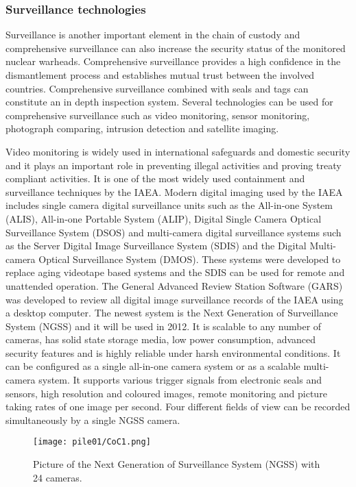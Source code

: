 \documentclass[twoside,titlepage,11pt,twocolumn,a4paper]{article}
\begin{document}
\subsubsection{Surveillance technologies}
Surveillance is another important element in the chain of custody and
comprehensive surveillance can also increase the security status of
the monitored nuclear warheads. Comprehensive surveillance provides a
high confidence in the dismantlement process and establishes mutual
trust between the involved countries. Comprehensive surveillance
combined with seals and tags can constitute an in depth inspection
system. Several technologies can be used for comprehensive
surveillance such as video monitoring, sensor monitoring, photograph
comparing, intrusion detection and satellite
imaging. \citep{wuwen2004}

Video monitoring is widely used in international safeguards and
domestic security and it plays an important role in preventing illegal
activities and proving treaty compliant activities. It is one of the
most widely used containment and surveillance techniques by the
IAEA. \citep{wuwen2004} Modern digital imaging used by the IAEA
includes single camera digital surveillance units such as the
All-in-one System (ALIS), All-in-one Portable System (ALIP), Digital
Single Camera Optical Surveillance System (DSOS) and multi-camera
digital surveillance systems such as the Server Digital Image
Surveillance System (SDIS) and the Digital Multi-camera Optical
Surveillance System (DMOS). These systems were developed to replace
aging videotape based systems and the SDIS can be used for remote and
unattended operation. The General Advanced Review Station Software
(GARS) was developed to review all digital image surveillance records
of the IAEA using a desktop
computer. \citep{equipmentIAEAinspectors2002} The newest system is the
Next Generation of Surveillance System (NGSS) and it will be used in
2012. It is scalable to any number of cameras, has solid state storage
media, low power consumption, advanced security features and is highly
reliable under harsh environmental conditions. It can be configured as
a single all-in-one camera system or as a scalable multi-camera
system. It supports various trigger signals from electronic seals and
sensors, high resolution and coloured images, remote monitoring and
picture taking rates of one image per second. Four different fields of
view can be recorded simultaneously by a single NGSS
camera. \citep{IAEAsafeguards2011}

\begin{figure}
  \texttt{[image: pile01/CoC1.png]}
  \caption{Picture of the Next Generation of Surveillance System
    (NGSS) with 24 cameras. \citep{IAEAsafeguards2011}}
\end{figure}
\end{document}
